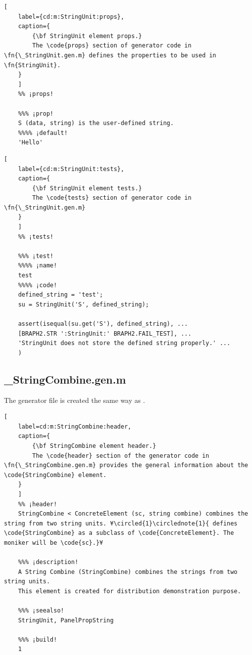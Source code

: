 \documentclass{tufte-handout}
\begin{document}
\begin{lstlisting}[
	label={cd:m:StringUnit:props},
	caption={
		{\bf StringUnit element props.}
		The \code{props} section of generator code in \fn{\_StringUnit.gen.m} defines the properties to be used in \fn{StringUnit}.
	}
	]
	%% ¡props!
	
	%%% ¡prop! 
	S (data, string) is the user-defined string.
	%%%% ¡default!
	'Hello'
\end{lstlisting}

\begin{lstlisting}[
	label={cd:m:StringUnit:tests},
	caption={
		{\bf StringUnit element tests.}
		The \code{tests} section of generator code in \fn{\_StringUnit.gen.m}
	}
	]
	%% ¡tests!
	
	%%% ¡test!
	%%%% ¡name!
	test
	%%%% ¡code!
	defined_string = 'test';
	su = StringUnit('S', defined_string);
	
	assert(isequal(su.get('S'), defined_string), ...
	[BRAPH2.STR ':StringUnit:' BRAPH2.FAIL_TEST], ...
	'StringUnit does not store the defined string properly.' ...
	)
\end{lstlisting}

\clearpage

\subsection{\_StringCombine.gen.m}

The  generator file is created the same way as .

\begin{lstlisting}[
	label=cd:m:StringCombine:header,
	caption={
		{\bf StringCombine element header.}
		The \code{header} section of the generator code in \fn{\_StringCombine.gen.m} provides the general information about the \code{StringCombine} element.
	}
	]
	%% ¡header!
	StringCombine < ConcreteElement (sc, string combine) combines the string from two string units. ¥\circled{1}\circlednote{1}{ defines \code{StringCombine} as a subclass of \code{ConcreteElement}. The moniker will be \code{sc}.}¥
	
	%%% ¡description!
	A String Combine (StringCombine) combines the strings from two string units.
	This element is created for distribution demonstration purpose.
	
	%%% ¡seealso!
	StringUnit, PanelPropString
	
	%%% ¡build!
	1
\end{lstlisting}
\end{document}
